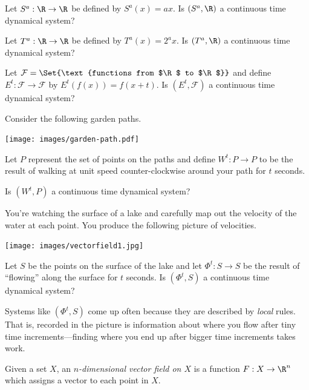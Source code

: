 	\question
	\begin{parts}
		\item Let $S^a:\R\to\R$ be defined by $S^a(x)=ax$. Is $(S^a,\R)$ a continuous time dynamical system?
		\item Let $T^a:\R\to\R$ be defined by $T^a(x)=2^a x$. Is $(T^a,\R)$ a continuous time dynamical system?
		\item Let $\mathcal F=\Set{\text{functions from $\R$ to $\R$}}$ and define $E^t:\mathcal F\to\mathcal F$
			by $E^t(f(x)) = f(x+t)$. Is $(E^t,\mathcal F)$ a continuous time dynamical system?
	\end{parts}

	\newpage
	\question
	\begin{parts}
		\item 

		Consider the following garden paths.
		\begin{center}
			\texttt{[image: images/garden-path.pdf]}
		\end{center}
		Let $P$ represent the set of points on the paths and define $W^t:P\to P$ to be the result of walking
		at unit speed counter-clockwise around your path for $t$ seconds.

			Is $(W^t,P)$ a continuous time dynamical system?

		\item You're watching the surface of a lake and carefully map out the velocity of the
			water at each point. You produce the following picture of velocities.
		\begin{center}
			\texttt{[image: images/vectorfield1.jpg]}
		\end{center}
			Let $S$ be the points on the surface of the lake and let $\Phi^t:S\to S$ be the result
			of ``flowing'' along the surface for $t$ seconds. Is $(\Phi^t, S)$ a continuous time dynamical system?
	\end{parts}

	Systems like $(\Phi^t,S)$ come up often because they are described by \emph{local} rules. That is, recorded in the
	picture is information about where you flow after tiny time increments---finding where you end up after bigger time
	increments takes work.

	\newpage
	\begin{definition}
		Given a set $X$, an \emph{$n$-dimensional vector field on $X$} is a function $F:X\to \R^n$ which
		assigns a vector to each point in $X$.
	\end{definition}


